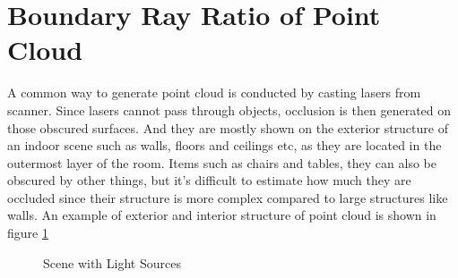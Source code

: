 \documentclass[11pt, a4paper,oneside,chapterprefix=false]{scrbook}
\begin{document}
\section{Boundary Ray Ratio of Point Cloud}

A common way to generate point cloud is conducted by casting lasers from scanner. Since lasers cannot pass through objects, occlusion is then generated on those obscured surfaces. And they are mostly shown on the exterior structure of an indoor scene such as walls, floors and ceilings etc, as they are located in the outermost layer of the room. Items such as chairs and tables, they can also be obscured by other things, but it's difficult to estimate how much they are occluded since their structure is more complex compared to large structures like walls. An example of exterior and interior structure of point cloud is shown in figure \ref{fig:Exterior and interior structure of a point cloud}

\begin{figure}[H]
    \centering
     \label{fig:exterior} 
     \label{fig:interior}
    \caption{Scene with Light Sources}
    \label{fig:Exterior and interior structure of a point cloud}
\end{figure}

\vspace{10pt}
\end{document}

